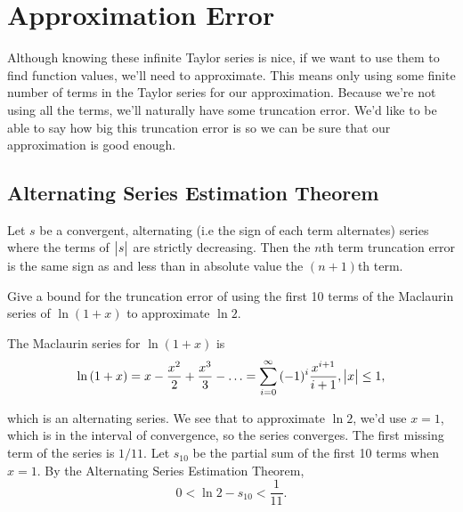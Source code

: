 \section{Approximation Error}
Although knowing these infinite Taylor series is nice, if we want to use them to find function values, we'll need to approximate.
This means only using some finite number of terms in the Taylor series for our approximation.
Because we're not using all the terms, we'll naturally have some truncation error.
We'd like to be able to say how big this truncation error is so we can be sure that our approximation is good enough.

\subsection{Alternating Series Estimation Theorem}
\begin{theorem}
	Let $s$ be a convergent, alternating (i.e the sign of each term alternates) series where the terms of $\big\lvert s \big\rvert$ are strictly decreasing.
	Then the $n$th term truncation error is the same sign as and less than in absolute value the $(n+1)$th term.
\end{theorem}

\begin{example}
	Give a bound for the truncation error of using the first 10 terms of the Maclaurin series of $\ln{(1+x)}$ to approximate $\ln{2}$.
\end{example}
\begin{answer}
	The Maclaurin series for $\ln{(1+x)}$ is
	\begin{equation*}
		\ln{(1+x)} = x - \frac{x^2}{2} + \frac{x^3}{3} - \ldots = \sum_{i=0}^{\infty}{(-1)^i\frac{x^{i+1}}{i+1}}, \big\lvert x \big\rvert \leq 1,
	\end{equation*}
	
	which is an alternating series.
	We see that to approximate $\ln{2}$, we'd use $x=1$, which is in the interval of convergence, so the series converges.
	The first missing term of the series is $1/11$.
	Let $s_{10}$ be the partial sum of the first 10 terms when $x=1$.
	By the Alternating Series Estimation Theorem,
	\begin{equation*}
		0 < \ln{2} - s_{10} < \frac{1}{11}. 
	\end{equation*}
\end{answer}

